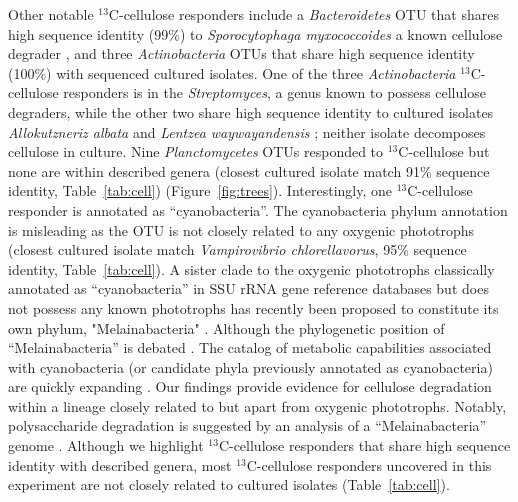 Other notable $^{13}$C-cellulose responders include a \textit{Bacteroidetes}
OTU that shares high sequence identity (99\%) to \textit{Sporocytophaga
myxococcoides} a known cellulose degrader \citep{Vance_1980}, and three
\textit{Actinobacteria} OTUs that share high sequence identity (100\%) with
sequenced cultured isolates. One of the three \textit{Actinobacteria}
$^{13}$C-cellulose responders is in the \textit{Streptomyces}, a genus known to
possess cellulose degraders, while the other two share high sequence identity
to cultured isolates \textit{Allokutzneriz albata} \citep{Labeda_2008,
Tomita_1993} and \textit{Lentzea waywayandensis} \citep{LABEDA_1989,
Labeda_2001}; neither isolate decomposes cellulose in culture. Nine
\textit{Planctomycetes} OTUs responded to $^{13}$C-cellulose but none are within
described genera (closest cultured isolate match 91\% sequence identity,
Table~\ref{tab:cell}) (Figure~\ref{fig:trees}). Interestingly, one
$^{13}$C-cellulose responder is annotated as ``cyanobacteria''.
The cyanobacteria phylum annotation is misleading as the OTU is not closely
related to any oxygenic phototrophs (closest cultured isolate match
\textit{Vampirovibrio chlorellavorus}, 95\% sequence identity,
Table~\ref{tab:cell}). A sister clade to the oxygenic phototrophs classically
annotated as ``cyanobacteria'' in SSU rRNA gene reference databases but does
not possess any known phototrophs has recently been proposed to constitute its own
phylum, "Melainabacteria" \citet{Di_Rienzi_2013}. Although the phylogenetic
position of ``Melainabacteria'' is debated \citep{Soo_2014}. The catalog of
metabolic capabilities associated with cyanobacteria (or candidate phyla
previously annotated as cyanobacteria) are quickly expanding
\citep{Di_Rienzi_2013, Soo_2014}.  Our findings provide evidence for cellulose
degradation within a lineage closely related to but apart from oxygenic
phototrophs. Notably, polysaccharide degradation is suggested by an analysis of
a ``Melainabacteria'' genome \citep{Di_Rienzi_2013}. Although we highlight
$^{13}$C-cellulose responders that share high sequence identity with described
genera, most $^{13}$C-cellulose responders uncovered in this experiment are not
closely related to cultured isolates (Table~\ref{tab:cell}).

